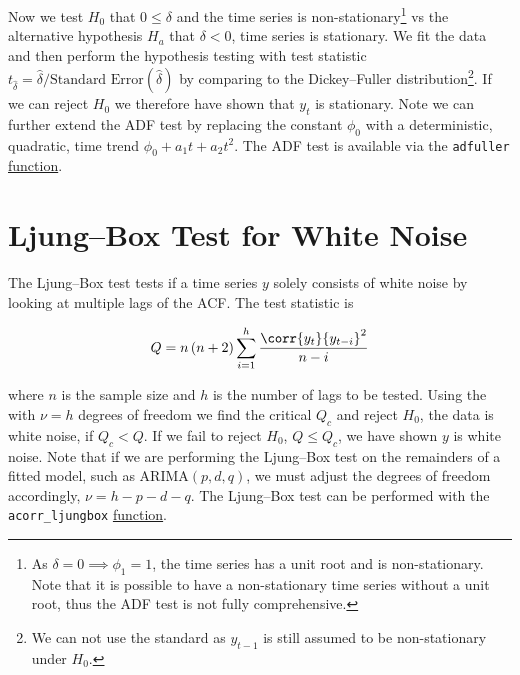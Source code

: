 Now we test $H_{0}$ that $0 \leq \delta$ and the time series is
non-stationary\footnote{As $\delta = 0 \implies \phi_{1} = 1$,
\ie the time series has a unit root and is non-stationary.
Note that it is possible to have a non-stationary time series without a unit root,
thus the ADF test is not fully comprehensive.} vs
the alternative hypothesis $H_{a}$ that $\delta < 0$, \ie time series is stationary.
We fit the data and then perform the hypothesis testing with test statistic
$t_{\hat{\delta}} = \hat{\delta} / \text{Standard Error}\left(\hat{\delta}\right)$
by comparing to the Dickey--Fuller distribution\footnote{We can not use the standard \tdist as $y_{t-1}$ is still assumed to be non-stationary under $H_{0}$.}.
If we can reject $H_{0}$ we therefore have shown that $y_{t}$ is stationary.
Note we can further extend the ADF test by replacing the constant $\phi_{0}$
with a deterministic, quadratic, time trend $\phi_{0} + a_{1} t + a_{2} t^{2}$.
The ADF test is available via the \texttt{adfuller}
\href{https://www.statsmodels.org/stable/generated/statsmodels.tsa.stattools.adfuller.html}{function}.

\section{Ljung--Box Test for White Noise}
\label{time_series:ljung_box}

The Ljung--Box test tests if a time series $y$ solely consists of white noise
by looking at multiple lags of the ACF.
The test statistic is

\begin{equation}\label{eq:time_series:ljung_box:Q}
Q = n \left(n+2\right) \sum_{i=1}^{h} \frac{\corr{y_{t}}{y_{t-i}}^{2}}{n-i}
\end{equation}

\noindent where $n$ is the sample size and $h$ is the number of lags to be tested.
Using the \chiSqdist with $\nu = h$ degrees of freedom we find the critical $Q_{c}$
and reject $H_{0}$, the data is white noise, if $Q_{c} < Q$.
If we fail to reject $H_{0}$, \ie $Q \leq Q_{c}$, we have shown $y$ is white noise.
Note that if we are performing the Ljung--Box test on the remainders of a fitted model, such as $\text{ARIMA}\left(p,d,q\right)$,
we must adjust the degrees of freedom accordingly, $\nu = h - p - d - q$.
The Ljung--Box test can be performed with the \texttt{acorr\_ljungbox}
\href{https://www.statsmodels.org/stable/generated/statsmodels.stats.diagnostic.acorr_ljungbox.html}{function}.


